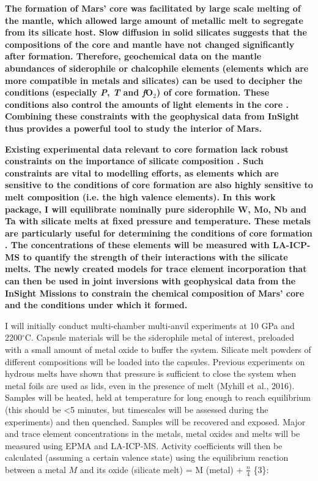 \documentclass[11pt,twoside,a4paper]{article}
\begin{document}
\textbf{The formation of Mars' core was facilitated by large scale melting of the mantle, which allowed large amount of metallic melt to segregate from its silicate host. Slow diffusion in solid silicates suggests that the compositions of the core and mantle have not changed significantly after formation. Therefore, geochemical data on the mantle abundances of siderophile or chalcophile elements (elements which are more compatible in metals and silicates) can be used to decipher the conditions (especially \emph{P}, \emph{T} and \emph{f}O$_2$) of core formation. These conditions also control the amounts of light elements in the core \citep{Rubieetal2015}. Combining these constraints with the geophysical data from InSight thus provides a powerful tool to study the interior of Mars.}

\textbf{Existing experimental data relevant to core formation lack robust constraints on the importance of silicate composition \citep{Righter2016}. Such constraints are vital to modelling efforts, as elements which are sensitive to the conditions of core formation are also highly sensitive to melt composition (i.e. the high valence elements). In this work package, I will equilibrate nominally pure siderophile W, Mo, Nb and Ta with silicate melts at fixed pressure and temperature. These metals are particularly useful for determining the conditions of core formation \citep{OBE2008,CHBBD2014}. The concentrations of these elements will be measured with LA-ICP-MS to quantify the strength of their interactions with the silicate melts. The newly created models for trace element incorporation that can then be used in joint inversions with geophysical data from the InSight Missions \citep[see WP3;][]{BBPSR2015} to constrain the chemical composition of Mars' core and the conditions under which it formed.}

I will initially conduct multi-chamber multi-anvil experiments at 10 GPa and 2200$^{\circ}$C. Capsule materials will be the siderophile metal of interest, preloaded with a small amount of metal oxide to buffer the system. Silicate melt powders of different compositions will be loaded into the capsules. Previous experiments on hydrous melts have shown that pressure is sufficient to close the system when metal foils are used as lids, even in the presence of melt (Myhill et al., 2016). Samples will be heated, held at temperature for long enough to reach equilibrium (this should be <5 minutes, but timescales will be assessed during the experiments) and then quenched. Samples will be recovered and exposed. Major and trace element concentrations in the metals, metal oxides and melts will be measured using EPMA and LA-ICP-MS. Activity coefficients will then be calculated (assuming a certain valence state) using the equilibrium reaction between a metal $M$ and its oxide  (silicate melt) = M (metal) + $\frac{n}{4}$ \{3\}:
\end{document}
